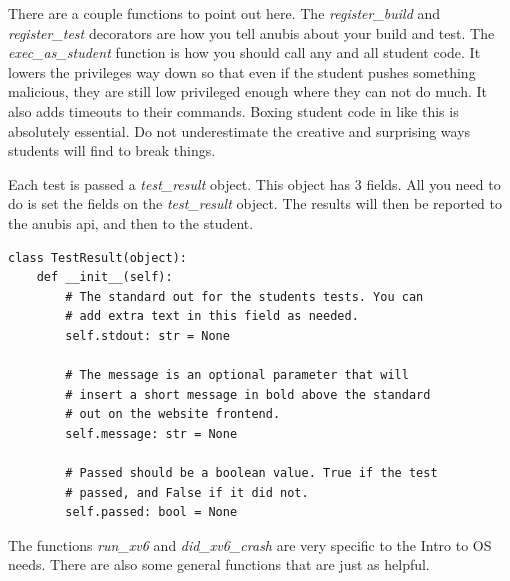 There are a couple functions to point out here.
The \textit{register\_build} and \textit{register\_test} decorators are how
you tell anubis about your build and test.
The \textit{exec\_as\_student} function is how you should call any and all student code.
It lowers the privileges way down so that even if the student pushes something
malicious, they are still low privileged enough where they can not do much.
It also adds timeouts to their commands.
Boxing student code in like this is absolutely essential.
Do not underestimate the creative and surprising ways students will find to break things.

Each test is passed a \textit{test\_result} object.
This object has 3 fields.
All you need to do is set the fields on the \textit{test\_result} object.
The results will then be reported to the anubis api, and then to the student.

\begin{verbatim}
class TestResult(object):
    def __init__(self):
        # The standard out for the students tests. You can
        # add extra text in this field as needed.
        self.stdout: str = None

        # The message is an optional parameter that will
        # insert a short message in bold above the standard
        # out on the website frontend.
        self.message: str = None

        # Passed should be a boolean value. True if the test
        # passed, and False if it did not.
        self.passed: bool = None
\end{verbatim}

The functions \textit{run\_xv6} and \textit{did\_xv6\_crash} are very specific to the Intro to OS needs.
There are also some general functions that are just as helpful.

